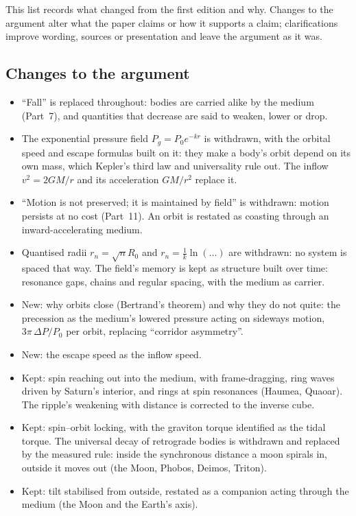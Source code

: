 \documentclass[11pt,a4paper]{article}
\begin{document}
This list records what changed from the first edition and why. Changes to the argument alter what the paper claims or how it supports a claim; clarifications improve wording, sources or presentation and leave the argument as it was.

\subsection*{Changes to the argument}
\begin{itemize}
\item ``Fall'' is replaced throughout: bodies are carried alike by the medium (Part~7), and quantities that decrease are said to weaken, lower or drop.
\item The exponential pressure field $P_g=P_0e^{-kr}$ is withdrawn, with the orbital speed and escape formulas built on it: they make a body's orbit depend on its own mass, which Kepler's third law and universality rule out. The inflow $v^2=2GM/r$ and its acceleration $GM/r^2$ replace it.
\item ``Motion is not preserved; it is maintained by field'' is withdrawn: motion persists at no cost (Part~11). An orbit is restated as coasting through an inward-accelerating medium.
\item Quantised radii $r_n=\sqrt{n}R_0$ and $r_n=\frac1k\ln(\ldots)$ are withdrawn: no system is spaced that way. The field's memory is kept as structure built over time: resonance gaps, chains and regular spacing, with the medium as carrier.
\item New: why orbits close (Bertrand's theorem) and why they do not quite: the precession as the medium's lowered pressure acting on sideways motion, $3\pi\,\Delta P/P_0$ per orbit, replacing ``corridor asymmetry''.
\item New: the escape speed as the inflow speed.
\item Kept: spin reaching out into the medium, with frame-dragging, ring waves driven by Saturn's interior, and rings at spin resonances (Haumea, Quaoar). The ripple's weakening with distance is corrected to the inverse cube.
\item Kept: spin--orbit locking, with the graviton torque identified as the tidal torque. The universal decay of retrograde bodies is withdrawn and replaced by the measured rule: inside the synchronous distance a moon spirals in, outside it moves out (the Moon, Phobos, Deimos, Triton).
\item Kept: tilt stabilised from outside, restated as a companion acting through the medium (the Moon and the Earth's axis).

\end{itemize}
\end{document}
